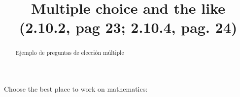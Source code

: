 \documentclass{ximera}
\title{Multiple choice and the like (2.10.2, pag 23; 2.10.4, pag. 24)}
\begin{document}
  

\begin{abstract}  
	Ejemplo de preguntas de elección múltiple
\end{abstract}  

\maketitle  

\begin{exercise}  
  Choose the best place to work on mathematics:
  \begin{multipleChoice}  
  \end{multipleChoice}  
\end{exercise}  
\end{document}
